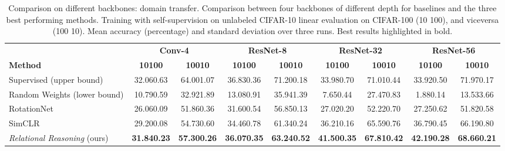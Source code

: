 \documentclass{article}
\begin{document}
\begin{table}[H]
 \caption{Comparison on different backbones: domain transfer. Comparison between four backbones of different depth for baselines and the three best performing methods. Training with self-supervision on unlabeled CIFAR-10 linear evaluation on CIFAR-100 (10  100), and viceversa (100  10). Mean accuracy (percentage) and standard deviation over three runs. Best results highlighted in bold.}
 \label{tab:backbones_domain_transfer}
 \begin{adjustbox}{width=1.0\columnwidth,center}
  \centering
  \begin{tabular}{lcccccccc}
    \toprule
     & \multicolumn{2}{c}{\textbf{Conv-4}} & \multicolumn{2}{c}{\textbf{ResNet-8}} & \multicolumn{2}{c}{\textbf{ResNet-32}} & \multicolumn{2}{c}{\textbf{ResNet-56}}\\
    \cmidrule[0.1pt](r){2-3} \cmidrule[0.1pt](l){4-5} \cmidrule[0.1pt](l){6-7} \cmidrule[0.1pt](l){8-9}
    \textbf{Method} &
    \textbf{10100} & \textbf{10010} &
    \textbf{10100} & \textbf{10010} &
    \textbf{10100} & \textbf{10010} &
    \textbf{10100} & \textbf{10010} \\
    \midrule
    Supervised (upper bound) & 
    32.06\small{0.63} & 64.00\small{1.07} & 
    36.83\small{0.36} & 71.20\small{0.18} & 
    33.98\small{0.70} & 71.01\small{0.44} & 
    33.92\small{0.50} & 71.97\small{0.17} \\
    Random Weights (lower bound) & 
    10.79\small{0.59} & 32.92\small{1.89} & 
    13.08\small{0.91} & 35.94\small{1.39} & 
     7.65\small{0.44} & 27.47\small{0.83} &  
     1.88\small{0.14} & 13.53\small{3.66} \\
    \cmidrule(l){1-9}
    RotationNet \citep{gidaris2018unsupervised} & 
    26.06\small{0.09} & 51.86\small{0.36} & 
    31.60\small{0.54} & 56.85\small{0.13} & 
    27.02\small{0.20} & 52.22\small{0.70} & 
    27.25\small{0.62} & 51.82\small{0.58} \\
    SimCLR \citep{chen2020simple} & 
    29.20\small{0.08} & 54.73\small{0.60} & 
    34.46\small{0.78} & 61.34\small{0.24} & 
    36.21\small{0.16} & 65.59\small{0.76} & 
    36.79\small{0.45} & 66.19\small{0.80} \\    
    \emph{Relational Reasoning} (ours) & 
    \textbf{31.84\small{0.23}} & \textbf{57.30\small{0.26}} & 
    \textbf{36.07\small{0.35}} & \textbf{63.24\small{0.52}} & 
    \textbf{41.50\small{0.35}} & \textbf{67.81\small{0.42}} & 
    \textbf{42.19\small{0.28}} & \textbf{68.66\small{0.21}} \\
    \bottomrule
  \end{tabular}
 \end{adjustbox}
\end{table}
\end{document}
